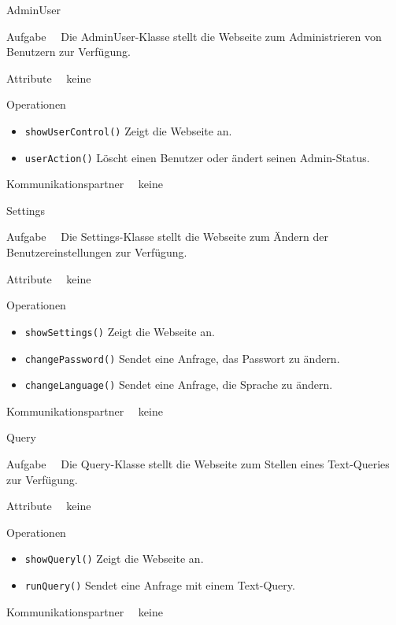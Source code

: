 \begin{class}{30}{AdminUser}
\item[Aufgabe]~\
Die AdminUser-Klasse stellt die Webseite zum Administrieren von Benutzern zur Verfügung.
\item[Attribute]~\ keine
\item[Operationen]~\
\begin{itemize}
    \item \texttt{showUserControl()} Zeigt die Webseite an.
    \item \texttt{userAction()} Löscht einen Benutzer oder ändert seinen Admin-Status.
\end{itemize}
\item[Kommunikationspartner]~\ keine
\end{class}

\begin{class}{40}{Settings}
\item[Aufgabe]~\
Die Settings-Klasse stellt die Webseite zum Ändern der Benutzereinstellungen zur Verfügung.
\item[Attribute]~\ keine
\item[Operationen]~\
\begin{itemize}
    \item \texttt{showSettings()} Zeigt die Webseite an.
    \item \texttt{changePassword()} Sendet eine Anfrage, das Passwort zu ändern.
    \item \texttt{changeLanguage()} Sendet eine Anfrage, die Sprache zu ändern.
\end{itemize}
\item[Kommunikationspartner]~\ keine
\end{class}

\begin{class}{50}{Query}
\item[Aufgabe]~\
Die Query-Klasse stellt die Webseite zum Stellen eines Text-Queries zur Verfügung.
\item[Attribute]~\ keine
\item[Operationen]~\
\begin{itemize}
    \item \texttt{showQueryl()} Zeigt die Webseite an.
    \item \texttt{runQuery()} Sendet eine Anfrage mit einem Text-Query.
\end{itemize}
\item[Kommunikationspartner]~\ keine
\end{class}

